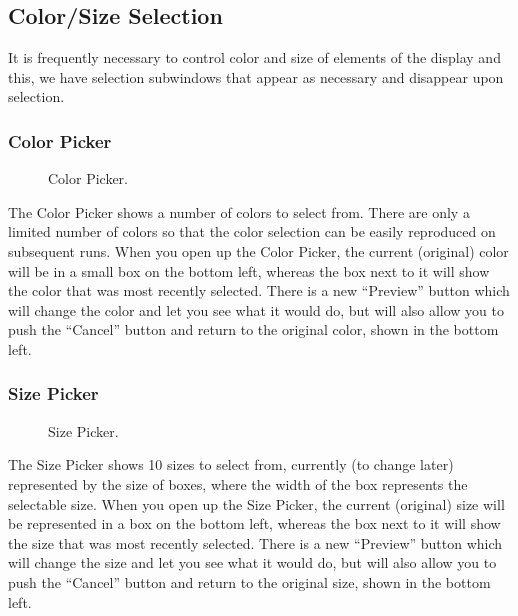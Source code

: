 
\subsection{Color/Size Selection}
\label{sec:control-color} 

It is frequently necessary to control color and size of elements of the
\map{} display and this, we have selection subwindows that appear as
necessary and disappear upon selection.


\subsubsection{Color Picker}

\begin{figure}[htb]
  \begin{makeimage}
  \end{makeimage}
  \caption{\label{fig:colorpicker1} Color Picker.}
\end{figure}


The Color Picker shows a number of colors to select from.  There are only a
limited number of colors so that the color selection can be easily
reproduced on subsequent runs.  When you open up the Color Picker, the
current (original) color will be in a small box on the bottom left, whereas
the box next to it will show the color that was most recently selected.
There is a new ``Preview'' button which will change the color and let you
see what it would do, but will also allow you to push the ``Cancel'' button
and return to the original color, shown in the bottom left.

\subsubsection{Size Picker}

\begin{figure}[htb]
  \begin{makeimage}
  \end{makeimage}
  \sizepicker
  \caption{\label{fig:sizepicker1} Size Picker.}
\end{figure}


The Size Picker shows 10 sizes to select from, currently (to change later)
represented by the size of boxes, where the width of the box represents the
selectable size.  When you open up the Size Picker, the current (original)
size will be represented in a box on the bottom left, whereas the box next
to it will show the size that was most recently selected.  There is a new
``Preview'' button which will change the size and let you see what it would
do, but will also allow you to push the ``Cancel'' button and return to the
original size, shown in the bottom left.

